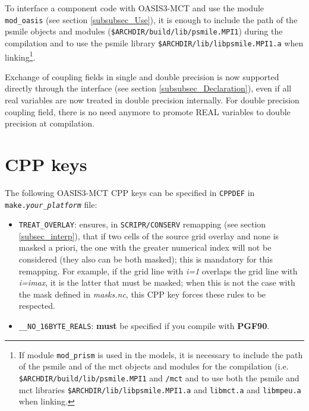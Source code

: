 To interface  a component code with OASIS3-MCT and use the module {\tt mod\_oasis} (see section \ref{subsubsec_Use}), it is enough to include the path of the psmile objects and
modules ({\tt \$ARCHDIR/build/lib/psmile.MPI1}) during the compilation and to use the psmile library {\tt \$ARCHDIR/lib/libpsmile.MPI1.a} when
linking\footnote{If module {\tt mod\_prism} is used in the models, it is necessary to
include the path of the psmile and of the mct objects and modules for
the compilation (i.e. {\tt \$ARCHDIR/build/lib/psmile.MPI1} and {\tt /mct} and to use both the psmile and mct libraries {\tt \$ARCHDIR/lib/libpsmile.MPI1.a} and {\tt libmct.a} and {\tt libmpeu.a} when linking.}.

Exchange of coupling fields in single and double precision is now supported directly through the interface 
(see section \ref{subsubsec_Declaration}), even if all real variables are now treated in double precision internally.
For double precision coupling field, there is no need anymore to promote REAL variables to double precision at compilation.

\section{CPP keys}
\label{subsec_cpp}

The following OASIS3-MCT CPP keys can be specified in {\tt CPPDEF} in {\tt make.{\it your\_platform}} file:
\begin{itemize}
\item {\tt TREAT\_OVERLAY}:  ensures, in {\tt SCRIPR/CONSERV}
  remapping (see section \ref{subsec_interp}), that if two cells of
  the source grid overlay and none is masked a priori, the one with the greater numerical
  index will not be considered (they also can be both masked); this is mandatory
  for this remapping. For example, if the grid line with {\it i=1} overlaps
  the grid line with {\it i=imax}, it is the latter that must be masked;
  when this is not the case with the mask defined in {\it masks.nc},
  this CPP key forces these rules to be respected.

\item {\tt \_\_NO\_16BYTE\_REALS}:  {\bf must} be specified  if you compile
with {\bf PGF90}.
\end{itemize}


